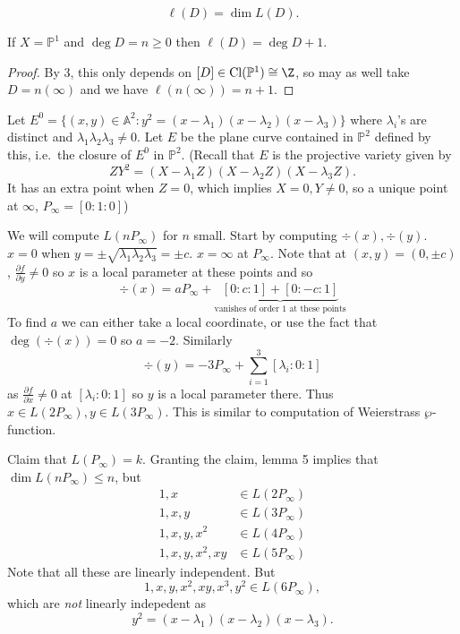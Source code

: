 \documentclass[a4paper]{article}
\renewcommand{\A}{\mathbb{A}}
\DeclareMathOperator{\Cl}{Cl}
\renewcommand*{\P}{\mathbb{P}}
\begin{document}
\begin{definition}
  \[
    \ell(D) = \dim L(D).
  \]
\end{definition}

\begin{eg}
  If \(X = \P^1\) and \(\deg D = n \geq 0\) then \(\ell(D) = \deg D + 1\).

  \begin{proof}
    By 3, this only depends on \([D] \in \Cl (\P^1) \cong \Z\), so may as well take \(D = n (\infty)\) and we have \(\ell(n (\infty)) = n + 1\).
  \end{proof}
\end{eg}

\begin{eg}
  Let \(E^0 = \{(x, y) \in \A^2: y^2 = (x - \lambda_1) (x - \lambda_2) (x - \lambda_3)\}\) where \(\lambda_i\)'s are distinct and \(\lambda_1 \lambda_2 \lambda_3 \neq 0\). Let \(E\) be the plane curve contained in \(\P^2\) defined by this, i.e.\ the closure of \(E^0\) in \(\P^2\). (Recall that \(E\) is the projective variety given by
  \[
    ZY^2 = (X - \lambda_1Z)(X - \lambda_2Z)(X - \lambda_3Z).
  \]
  It has an extra point when \(Z = 0\), which implies \(X = 0, Y \neq 0\), so a unique point at \(\infty\), \(P_\infty = [0:1:0]\))

  We will compute \(L(nP_\infty)\) for \(n\) small. Start by computing \(\div (x), \div (y)\). \(x = 0\) when \(y = \pm \sqrt{\lambda_1\lambda_2\lambda_3} = \pm c\). \(x = \infty\) at \(P_\infty\). Note that at \((x, y) = (0, \pm c)\), \(\frac{\partial f}{\partial y} \neq 0\) so \(x\) is a local parameter at these points and so
  \[
    \div (x) = a P_\infty + \underbrace{[0:c:1] + [0:-c:1]}_{\text{vanishes of order \(1\) at these points}}
  \]
  To find \(a\) we can either take a local coordinate, or use the fact that \(\deg (\div(x)) = 0\) so \(a = -2\). Similarly
  \[
    \div (y) = -3 P_\infty + \sum_{i = 1}^3 [\lambda_i:0:1]
  \]
  as \(\frac{\partial f}{\partial x} \neq 0\) at \([\lambda_i:0:1]\) so \(y\) is a local parameter there. Thus \(x \in L(2P_\infty), y \in L(3P_\infty)\). This is similar to computation of Weierstrass \(\wp\)-function.

  Claim that \(L(P_\infty) = k\). Granting the claim, lemma 5 implies that \(\dim L(nP_\infty) \leq n\), but
  \begin{align*}
    1, x &\in L(2 P_\infty) \\
    1, x, y &\in L(3 P_\infty) \\
    1, x, y, x^2 &\in L(4 P_\infty) \\
    1, x, y, x^2, xy &\in L(5 P_\infty)
  \end{align*}
  Note that all these are linearly independent. But
  \[
    1, x, y, x^2, xy, x^3, y^2 \in L(6 P_\infty),
  \]
  which are \emph{not} linearly indepedent as
  \[
    y^2 = (x - \lambda_1)(x - \lambda_2)(x - \lambda_3).
  \]


\end{eg}
\end{document}
